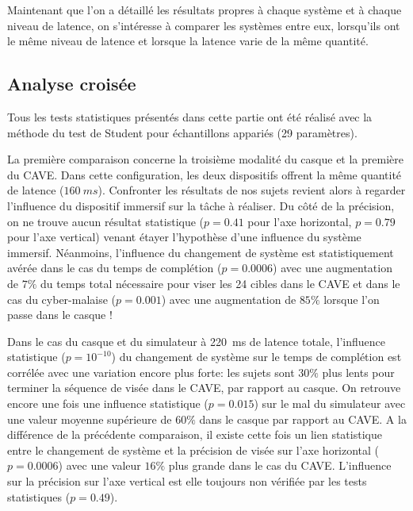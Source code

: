 	\par Maintenant que l'on a détaillé les résultats propres à chaque système et à chaque niveau de latence, on s'intéresse à comparer les systèmes entre eux, lorsqu'ils ont le même niveau de latence et lorsque la latence varie de la même quantité.
	
	\subsection{Analyse croisée}
	\par Tous les tests statistiques présentés dans cette partie ont été réalisé avec la méthode du test de Student pour échantillons appariés (29 paramètres).	
	
	\par La première comparaison concerne la troisième modalité du casque et la première du CAVE. Dans cette configuration, les deux dispositifs offrent la même quantité de latence ($160~ms$). Confronter les résultats de nos sujets revient alors à regarder l'influence du dispositif immersif sur la tâche à réaliser. Du côté de la précision, on ne trouve aucun résultat statistique ($p = 0.41$ pour l'axe horizontal, $p = 0.79$ pour l'axe vertical) venant étayer l'hypothèse d'une influence du système immersif. Néanmoins, l'influence du changement de système est statistiquement avérée dans le cas du temps de complétion ($p = 0.0006$) avec une augmentation de $7\%$ du temps total nécessaire pour viser les 24 cibles dans le CAVE et dans le cas du cyber-malaise ($p = 0.001$) avec une augmentation de $85\%$ lorsque l'on passe dans le casque !
	
	\par Dans le cas du casque et du simulateur à 220~ms de latence totale, l'influence statistique ($p = 10^{-10}$) du changement de système sur le temps de complétion est corrélée avec une variation encore plus forte: les sujets sont $30\%$ plus lents pour terminer la séquence de visée dans le CAVE, par rapport au casque. On retrouve encore une fois une influence statistique ($p = 0.015$) sur le mal du simulateur avec une valeur moyenne supérieure de $60\%$ dans le casque par rapport au CAVE. A la différence de la précédente comparaison, il existe cette fois un lien statistique entre le changement de système et la précision de visée sur l'axe horizontal ($p = 0.0006$) avec une valeur $16\%$ plus grande dans le cas du CAVE. L'influence sur la précision sur l'axe vertical est elle toujours non vérifiée par les tests statistiques ($p = 0.49$).
	

